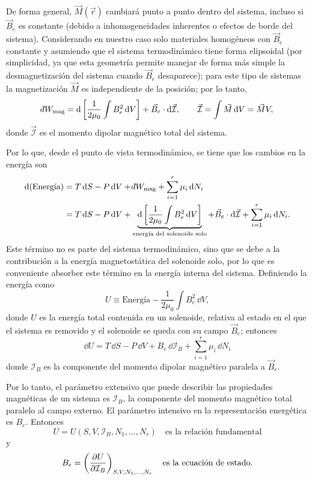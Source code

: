 De forma general, $\vec{M}(\vec{r})$ cambiará punto a punto dentro del sistema, incluso si $\vec{B}_e$
es constante (debido a inhomogeneidades inherentes o efectos de borde del sistema). Considerando en
nuestro caso solo materiales homogéneos con $\vec{B}_e$ constante y asumiendo que el sistema
termodinámico tiene forma elipsoidal (por simplicidad, ya que esta geometría permite manejar de
forma más simple la desmagnetización del sistema cuando $\vec{B}_e$ desaparece); para este tipo de
sistemas la magnetización $\vec{M}$ es independiente de la posición; por lo tanto,
\begin{equation*}
  \dbar W_{\mathrm{mag}}=\dd\left[\frac{1}{2\mu_0}\int B_e^{2}\,\dd V\right]+\vec{B}_e\cdot\dd\vec{\mathcal{I}},
  \qquad\vec{\mathcal{I}}=\int\vec{M}\,\dd V=\vec{M}V,
\end{equation*}
donde $\vec{\mathcal{I}}$ es el momento dipolar magnético total del sistema.

Por lo que, desde el punto de vista termodinámico, se tiene que los cambios en la energía son
\begin{align*}
  \dd(\text{Energía})&=T\,\dd S-P\,\dd V+\dbar W_{\mathrm{mag}}+\sum_{i=1}^{r}\mu_i\,\dd N_i\\
  &=T\,\dd S-P\,\dd V+\underbrace{\dd\left[\frac{1}{2\mu_0}\int B_e^{2}\,\dd V\right]}_{\text{energía del solenoide solo}}+\vec{B}_e\cdot\dd\vec{\mathcal{I}}+\sum_{i=1}^{r}\mu_i\,\dd N_i.
\end{align*}
Este término no es parte del sistema termodinámico, sino que se debe a la contribución a la energía
magnetostática del solenoide solo, por lo que es conveniente absorber este término en la energía
interna del sistema. Definiendo la energía como
\begin{equation*}
  U\equiv\text{Energía}-\frac{1}{2\mu_0}\int B_e^{2}\,\dd V,
\end{equation*}
donde $U$ es la energía total contenida en un solenoide, relativa al estado en el que el sistema es
removido y el solenoide se queda con su campo $\vec{B}_e$; entonces
\begin{equation*}
  \boxed{\dd U=T\,\dd S-P\,\dd V+B_e\,\dd\mathcal{I}_B+\sum_{i=1}^{r}\mu_i\,\dd N_i}
\end{equation*}
donde $\mathcal{I}_B$ es la componente del momento dipolar magnético paralela a $\vec{B}_e$.

Por lo tanto, el parámetro extensivo que puede describir las propiedades magnéticas de un sistema es
$\mathcal{I}_B$, la componente del momento magnético total paralelo al campo externo. El parámetro
intensivo en la representación energética es $B_e$. Entonces
\begin{equation*}
  U=U(S,V,\mathcal{I}_B,N_1,\dots,N_r)\quad\text{es la relación fundamental}
\end{equation*}
y
\begin{equation*}
  B_e=\left(\frac{\partial U}{\partial \mathcal{I}_B}\right)_{S,V,N_1,\dots,N_r}\quad\text{es la ecuación de estado.}
\end{equation*}

